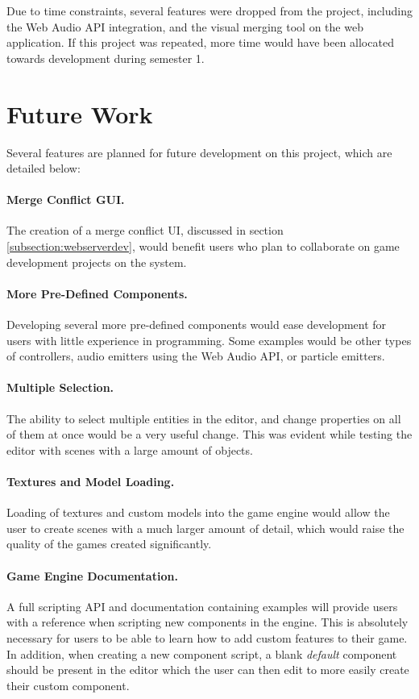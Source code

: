 Due to time constraints, several features were dropped from the project, including the Web Audio API integration, and the visual merging tool on the web application. If this project was repeated, more time would have been allocated towards development during semester 1.

\section{Future Work}
\label{section:futurework}
Several features are planned for future development on this project, which are detailed below:

\paragraph{Merge Conflict GUI.}
The creation of a merge conflict UI, discussed in section \ref{subsection:webserverdev}, would benefit users who plan to collaborate on game development projects on the system.

\paragraph{More Pre-Defined Components.}
Developing several more pre-defined components would ease development for users with little experience in programming. Some examples would be other types of controllers, audio emitters using the Web Audio API, or particle emitters.

\paragraph{Multiple Selection.}
The ability to select multiple entities in the editor, and change properties on all of them at once would be a very useful change. This was evident while testing the editor with scenes with a large amount of objects.

\paragraph{Textures and Model Loading.}
Loading of textures and custom models into the game engine would allow the user to create scenes with a much larger amount of detail, which would raise the quality of the games created significantly.

\paragraph{Game Engine Documentation.}
A full scripting API and documentation containing examples will provide users with a reference when scripting new components in the engine. This is absolutely necessary for users to be able to learn how to add custom features to their game. In addition, when creating a new component script, a blank \emph{default} component should be present in the editor which the user can then edit to more easily create their custom component.
